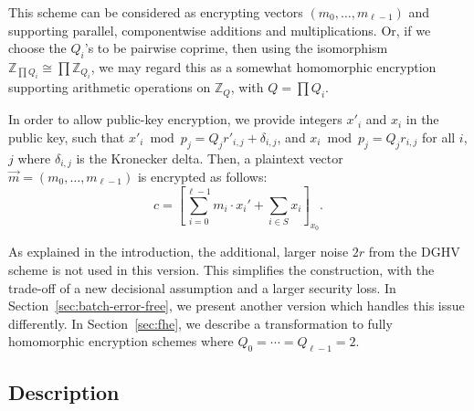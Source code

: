 \documentclass{llncs}
\newcommand{\Z}{{\mathbb Z}}
\begin{document}
This scheme can be considered as encrypting vectors $(m_0, \dots,
m_{\ell-1})$ and supporting parallel, componentwise
additions and multiplications.  Or, if we choose the $Q_i$'s to be pairwise coprime, then using the isomorphism 
$\Z_{\prod\!Q_i}\cong\prod\Z_{Q_i}$, we may regard this as a somewhat homomorphic encryption supporting arithmetic operations
on $\Z_Q$, with $Q=\prod {Q_i}$.

In order to allow public-key encryption, we provide integers $x'_i$ and $x_i$ in the public key, such that $x'_i\bmod{p_j}=Q_{j}r'_{i,j}+\delta_{i,j}$, and $x_i\bmod{p_j}=Q_{j}r_{i,j}$ for all $i$, $j$ where $\delta_{i,j}$ is the Kronecker delta. Then, a plaintext vector $\vec{m}=(m_0, \dots, m_{\ell-1})$ is encrypted as follows:
\[
c=\left[\sum_{i=0}^{\ell-1}m_i\cdot x_i'+\sum_{i\in S} x_i\right]_{x_0}.
\]

As explained in the introduction, the additional, larger noise $2r$ from the DGHV scheme is not used in this version.
This simplifies the construction, with the trade-off of a new
decisional assumption and a larger security loss.  
In Section~\ref{sec:batch-error-free}, we present another version which handles this issue differently.
In Section~\ref{sec:fhe}, we describe a transformation to fully homomorphic encryption schemes where $Q_0=\cdots=Q_{\ell-1}=2$.
\subsection{Description}
\end{document}
